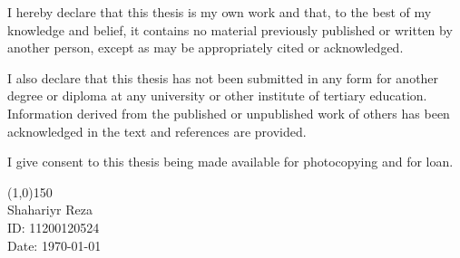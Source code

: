 I hereby declare that this thesis is my own work and that, to the best of my knowledge and belief, it contains no material previously published or written by another person, except as may be appropriately cited or acknowledged.

I also declare that this thesis has not been submitted in any form for another degree or diploma at any university or other institute of tertiary education. Information derived from the published or unpublished work of others has been acknowledged in the text and references are provided.

I give consent to this thesis being made available for photocopying and for loan.

\vspace{2cm}

\noindent \line(1,0){150} \\
Shahariyr Reza \\
ID: 11200120524 \\
Date: \today
